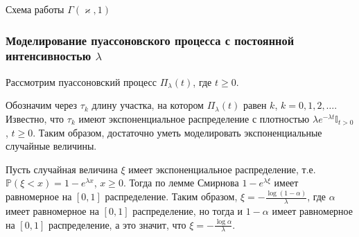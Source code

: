 \documentclass[a4paper,12pt]{article}
\numberwithin{equation}{section}
\begin{document}
	\begin{algorithm}[H]
		\SetAlgoLined %
		
		
		
		\caption{Схема работы $
			\Gamma(\varkappa,1)$}
	\end{algorithm}
	\subsubsection{Моделирование пуассоновского процесса с постоянной интенсивностью $\lambda$}
	Рассмотрим пуассоновский процесс $\Pi_{\lambda}(t)$, где $t \geq 0$. 
	
	Обозначим через $\tau_k$ длину участка, на котором $\Pi_{\lambda}(t)$ равен $k$, $k = 0,1,2,\ldots$. Известно, что $\tau_k$ имеют экспоненциальное распределение с плотностью $\lambda e^{-\lambda t}\mathbb{I}_{t>0}$, $t\geq 0$. Таким образом, достаточно уметь моделировать экспоненциальные случайные величины.
	
	Пусть случайная величина $\xi$ имеет экспоненциальное распределение, т.е. $\mathbb{P}(\xi < x) = 1-e^{\lambda x}$, $x \geq 0$. Тогда по лемме Смирнова $1 - e^{\lambda \xi}$ имеет равномерное на $[0,1]$ распределение. Таким образом, $\xi = -\frac{\log(1-\alpha)}{\lambda}$, где $\alpha$ имеет равномерное на $[0,1]$ распределение, но тогда и $1-\alpha$ имеет равномерное на $[0,1]$ распределение, а это значит, что $\xi = -\frac{\log \alpha}{\lambda}$. 
	
\end{document}
